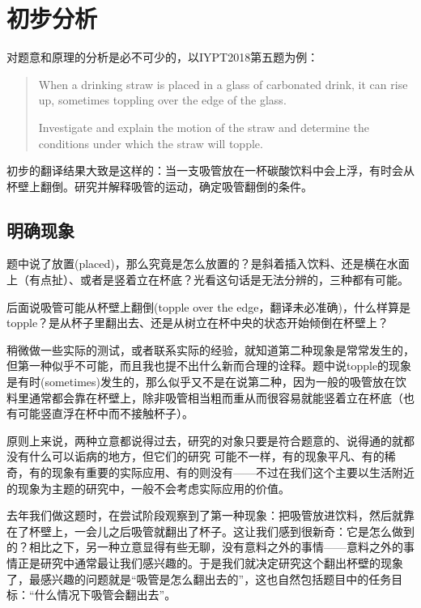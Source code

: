 \documentclass[a4paper,10pt,english]{sphinxmanual}
\begin{document}
\section{初步分析}
\label{\detokenize{5. Research:id2}}
对题意和原理的分析是必不可少的，以IYPT2018第五题为例：
\begin{quote}

When a drinking straw is placed in a glass of carbonated drink, it can rise up, sometimes toppling over the edge of the glass.

Investigate and explain the motion of the straw and determine the conditions under which the straw will topple.
\end{quote}

初步的翻译结果大致是这样的：当一支吸管放在一杯碳酸饮料中会上浮，有时会从杯壁上翻倒。研究并解释吸管的运动，确定吸管翻倒的条件。


\subsection{明确现象}
\label{\detokenize{5. Research:id3}}
题中说了放置(placed)，那么究竟是怎么放置的？是斜着插入饮料、还是横在水面上（有点扯）、或者是竖着立在杯底？光看这句话是无法分辨的，三种都有可能。

后面说吸管可能从杯壁上翻倒(topple over the edge，翻译未必准确)，什么样算是topple？是从杯子里翻出去、还是从树立在杯中央的状态开始倾倒在杯壁上？

稍微做一些实际的测试，或者联系实际的经验，就知道第二种现象是常常发生的，但第一种似乎不可能，而且我也提不出什么新而合理的诠释。题中说topple的现象是有时(sometimes)发生的，那么似乎又不是在说第二种，因为一般的吸管放在饮料里通常都会靠在杯壁上，除非吸管相当粗而重从而很容易就能竖着立在杯底（也有可能竖直浮在杯中而不接触杯子）。

原则上来说，两种立意都说得过去，研究的对象只要是符合题意的、说得通的就都没有什么可以诟病的地方，但它们的研究  可能不一样，有的现象平凡、有的稀奇，有的现象有重要的实际应用、有的则没有——不过在我们这个主要以生活附近的现象为主题的研究中，一般不会考虑实际应用的价值。

去年我们做这题时，在尝试阶段观察到了第一种现象：把吸管放进饮料，然后就靠在了杯壁上，一会儿之后吸管就翻出了杯子。这让我们感到很新奇：它是怎么做到的？相比之下，另一种立意显得有些无聊，没有意料之外的事情——意料之外的事情正是研究中通常最让我们感兴趣的。于是我们就决定研究这个翻出杯壁的现象了，最感兴趣的问题就是“吸管是怎么翻出去的”，这也自然包括题目中的任务目标：“什么情况下吸管会翻出去”。
\end{document}
